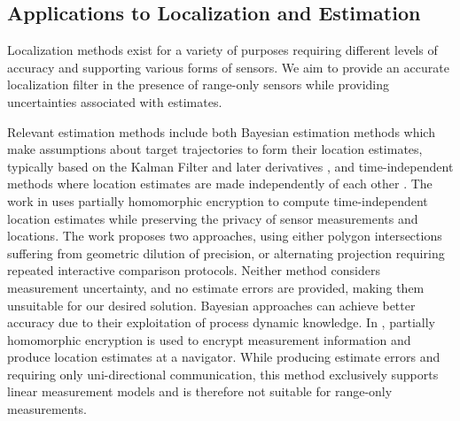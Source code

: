 \documentclass[10pt,letterpaper,oneside,twocolumn,journal]{IEEEtran}
\theoremstyle{definition}
\theoremstyle{definition}
\theoremstyle{remark}
\begin{document}
% 
% 

\subsection{Applications to Localization and Estimation}
Localization methods exist for a variety of purposes requiring different levels of accuracy and supporting various forms of sensors. We aim to provide an accurate localization filter in the presence of range-only sensors while providing uncertainties associated with estimates. 

Relevant estimation methods include both Bayesian estimation methods which make assumptions about target trajectories to form their location estimates, typically based on the Kalman Filter and later derivatives \cite{kalmanNewApproachLinear1960,mutambaraDecentralizedEstimationControl1998}, and time-independent methods where location estimates are made independently of each other \cite{alanwarPrOLocResilientLocalization2017,lazosSeRLocSecureRangeindependent2004}. The work in \cite{alanwarPrOLocResilientLocalization2017} uses partially homomorphic encryption to compute time-independent location estimates while preserving the privacy of sensor measurements and locations. The work proposes two approaches, using either polygon intersections suffering from geometric dilution of precision, or alternating projection requiring repeated interactive comparison protocols. Neither method considers measurement uncertainty, and no estimate errors are provided, making them unsuitable for our desired solution. Bayesian approaches can achieve better accuracy due to their exploitation of process dynamic knowledge. In \cite{aristovEncryptedMultisensorInformation2018}, partially homomorphic encryption is used to encrypt measurement information and produce location estimates at a navigator. While producing estimate errors and requiring only uni-directional communication, this method exclusively supports linear measurement models and is therefore not suitable for range-only measurements. 
\end{document}
